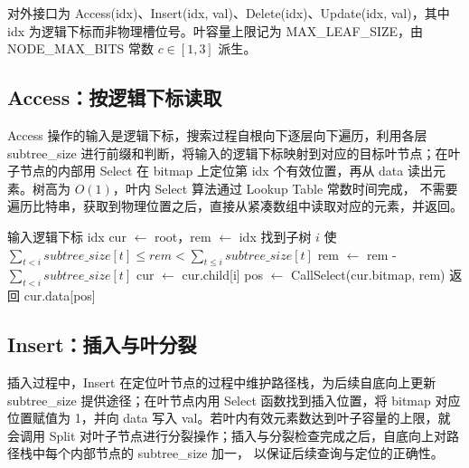 对外接口为 Access(idx)、Insert(idx, val)、Delete(idx)、Update(idx, val)，其中 idx 为逻辑下标而非物理槽位号。叶容量上限记为 MAX\_LEAF\_SIZE，由 NODE\_MAX\_BITS 常数 \(c\in[1,3]\) 派生\cite{bender2022otsh,kurpicz2023pachash,lehmann2024shockhash}。

\subsection{Access：按逻辑下标读取}

Access 操作的输入是逻辑下标，搜索过程自根向下逐层向下遍历，利用各层 subtree\_size 进行前缀和判断，将输入的逻辑下标映射到对应的目标叶节点；在叶子节点的内部用 Select 在 bitmap 上定位第 idx 个有效位置，再从 data 读出元素。树高为 \(O(1)\)，叶内 Select 算法通过 Lookup Table 常数时间完成\cite{jacobson1989,pagh2008retrieval,kurpicz2023pachash}， 不需要遍历比特串，获取到物理位置之后，直接从紧凑数组中读取对应的元素，并返回。

\begin{algorithm}[htbp]
  \caption{MiniArray.Access}
  \label{alg:miniarray-access}
  \begin{algorithmic}[1]
    \State 输入逻辑下标 idx
    \State cur $\gets$ root，rem $\gets$ idx
      \State 找到子树 $i$ 使 $\displaystyle\sum_{t<i}\mathit{subtree\_size}[t]\le \mathit{rem}<\sum_{t\le i}\mathit{subtree\_size}[t]$
      \State rem $\gets$ rem - $\displaystyle\sum_{t<i}\mathit{subtree\_size}[t]$
      \State cur $\gets$ cur.child[i]
    \EndWhile
    \State pos $\gets$ Call{Select}(cur.bitmap, rem)
    \State 返回 cur.data[pos]
  \end{algorithmic}
\end{algorithm}

\subsection{Insert：插入与叶分裂}

插入过程中，Insert 在定位叶节点的过程中维护路径栈，为后续自底向上更新 subtree\_size 提供途径；在叶节点内用 Select 函数找到插入位置，将 bitmap 对应位置赋值为 1，并向 data 写入 val。若叶内有效元素数达到叶子容量的上限，就会调用 Split 对叶子节点进行分裂操作；插入与分裂检查完成之后，自底向上对路径栈中每个内部节点的 subtree\_size 加一， 以保证后续查询与定位的正确性。


